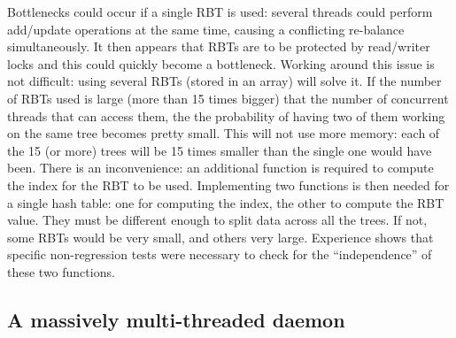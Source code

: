 \documentclass[final]{ols}
\begin{document}
Bottlenecks could occur if a single RBT is used: several threads could
perform add/update operations at the same time, causing a conflicting
re-balance simultaneously. It then appears that RBTs are to be
protected by read/writer locks and this could quickly become a
bottleneck.  Working around this issue is not difficult: using several
RBTs (stored in an array) will solve it. If the number of RBTs used is
large (more than 15 times bigger) that the number of concurrent
threads that can access them, the the probability of having two of them
working on the same tree becomes pretty small. This will not use more
memory: each of the 15 (or more) trees will be 15 times smaller than
the single one would have been.  There is an inconvenience: an
additional function is required to compute the index for the RBT to be
used. Implementing two functions is then needed for a single hash
table: one for computing the index, the other to compute the RBT
value. They must be different enough to split data across all the
trees. If not, some RBTs would be very small, and others very large.
Experience shows that specific non-regression tests were necessary to
check for the ``independence'' of these two functions.

\subsection{A massively multi-threaded daemon}
\end{document}
